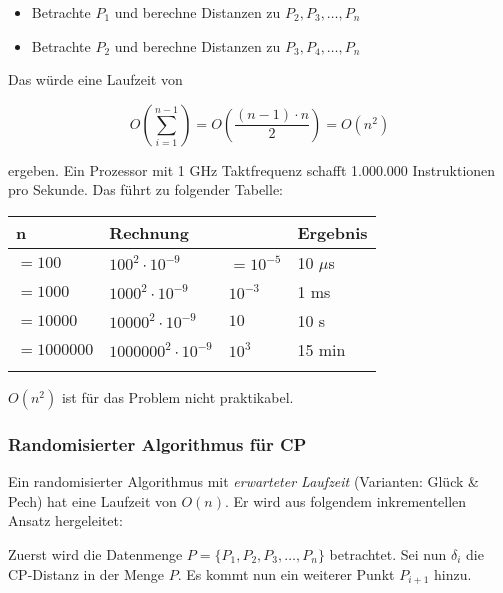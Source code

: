 \documentclass{scrartcl}%
\begin{document}
    \begin{itemize}
        \item Betrachte $P_1$ und berechne Distanzen zu $P_2, P_3, \dots, P_n$
        \item Betrachte $P_2$ und berechne Distanzen zu $P_3, P_4, \dots, P_n$
    \end{itemize}

    Das würde eine Laufzeit von

    \begin{equation*}
        O\left(\sum_{i=1}^{n-1}\right) = O\left( \frac{(n-1) \cdot n}{2} \right) = O(n^2)
    \end{equation*}

    ergeben.
    Ein Prozessor mit 1 GHz Taktfrequenz schafft
    1.000.000 Instruktionen pro Sekunde.
    Das führt zu folgender Tabelle:
    \begin{table}[!ht]
        \centering
        \begin{tabular}{llll}
            \textbf{\textsf{n}} & \textbf{\textsf{Rechnung}} & & \textbf{\textsf{Ergebnis}}\\
            \hline
            $=100       $ & $100^2 \cdot 10^{-9}$       & $=10^{-5}$   & 10 $\mu$s \\
            $=1000      $ & $1000^2 \cdot 10^{-9}$      & $10^{-3}$    & 1 ms \\
            $=10000     $ & $10000^2 \cdot 10^{-9}$     & $10$         & 10 s \\
            $=1000000   $ & $1000000^2 \cdot 10^{-9}$   & $10^3$       & 15 min \\
            \hline \\
        \end{tabular}
    \end{table}
    $O(n^2)$ ist für das Problem nicht praktikabel.

    \subsubsection*{Randomisierter Algorithmus für CP}
    \label{subsec:randomisierterAlgorithmusfürCP}

    Ein randomisierter Algorithmus mit \textit{erwarteter Laufzeit}
    (Varianten: Glück & Pech) hat eine Laufzeit von $O(n)$.
    Er wird aus folgendem inkrementellen Ansatz hergeleitet:

    Zuerst wird die Datenmenge $P = \{ P_1, P_2, P_3, \dots, P_n \}$ betrachtet.
    Sei nun $\delta_i$ die CP-Distanz in der Menge $P$.
    Es kommt nun ein weiterer Punkt $P_{i+1}$ hinzu.
\end{document}
